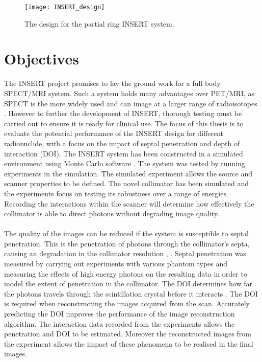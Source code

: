 \begin{figure}[htp]
    \centering
    \texttt{[image: INSERT\_design]} %
    \caption{The design for the partial ring INSERT system.} \label{fig:INSERT}
\end{figure}

\section{Objectives}
The INSERT project promises to lay the ground work for a full body SPECT/MRI system. Such a system holds many advantages over PET/MRI, as SPECT is the more widely used and can image at a larger range of radioisotopes \cite{doi:10.1177/153303460600500406}. However to further the development of INSERT, thorough testing must be carried out to ensure it is ready for clinical use. The focus of this thesis is to evaluate the potential performance of the INSERT design for different radionuclide, with a focus on the impact of septal penetration and depth of interaction (DOI). The INSERT system has been constructed in a simulated environment using Monte Carlo software \cite{1236960}. The system was tested by running experiments in the simulation. The simulated experiment allows the source and scanner properties to be defined. The novel collimator has been simulated and the experiments focus on testing its robustness over a range of energies. Recording the interactions within the scanner will determine how effectively the collimator is able to direct photons without degrading image quality.
\paragraph{} 
The quality of the images can be reduced if the system is susceptible to septal penetration. This is the penetration of photons through the collimator's septa, causing an degradation in the collimator resolution \cite{0031-9155-18-6-005}, \cite{0031-9155-50-21-004}. Septal penetration was measured by carrying out experiments with various phantom types and measuring the effects of high energy photons on the resulting data in order to model the extent of penetration in the collimator. The DOI determines how far the photons travels through the scintillation crystal before it interacts \cite{0031-9155-55-2-N04}. The DOI is required when reconstructing the images acquired from the scan. Accurately predicting the DOI improves the performance of the image reconstruction algorithm. The interaction data recorded from the experiments allows the penetration and DOI to be estimated. Moreover the reconstructed images from the experiment allows the impact of these phenomena to be realised in the final images.

